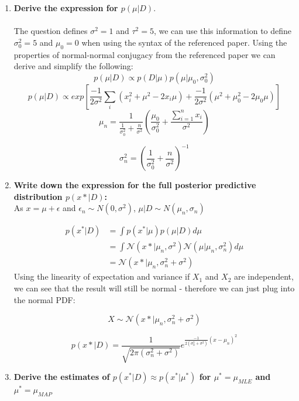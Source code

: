 \documentclass[submit]{harvardml}
\begin{document}
\begin{enumerate}
    \item \textbf{Derive the expression for $p(\mu | D)$}.\\ \\
    The question defines $\sigma^2 = 1$ and $\tau^2 = 5$, we can use this information to define $\sigma_0^2 = 5$ and $\mu_0 = 0$ when using the syntax of the referenced paper.
    Using the properties of normal-normal conjugacy from the referenced paper we can derive and simplify the following:
    $$
        p(\mu | D) \propto p(D | \mu)p(\mu | \mu_0,\sigma_0^2)
    $$
    $$
        p(\mu|D) \propto exp \left[ \frac{-1}{2\sigma^2} \sum_i (x_i^2 + \mu^2 - 2 x_i \mu) + \frac{-1}{2\sigma^2} (\mu^2 + \mu_0^2 - 2\mu_0 \mu) \right]
    $$
    $$
        \mu_n = \frac{1}{\frac{1}{\sigma_0^2} + \frac{n}{\sigma^2}} \left( \frac{\mu_0}{\sigma_0^2} + \frac{\sum^n_{i=1} x_i}{\sigma^2} \right)
    $$
    
    $$
        \sigma_n^2 = \left( \frac{1}{\sigma_0^2} + \frac{n}{\sigma^2} \right)^{-1}
    $$
    \item \textbf{Write down the expression for the full posterior predictive distribution $p(x* | D)$:}\\
    
    As $x = \mu + \epsilon$ and $\epsilon_n \sim N(0,\sigma^2)$, $\mu |D \sim N(\mu_n, \sigma_n)$ 
    
    \begin{align*}
        p(x^*|D) &= \int p(x^*|\mu)p(\mu|D) d\mu \\
        &= \int \mathcal{N} (x*|\mu_n , \sigma^2) \mathcal{N} (\mu | \mu_n, \sigma_n^2) d\mu \\
        &= \mathcal{N} (x*|\mu_n , \sigma^2_n + \sigma^2)
    \end{align*}
    Using the linearity of expectation and variance if $X_1$ and $X_2$ are independent, we can see that the result will still be normal - therefore we can just plug into the normal PDF:
    
    $$
        X \sim \mathcal{N} (x*|\mu_n , \sigma^2_n + \sigma^2)
    $$
    
    $$
        p(x* |D) = \frac{1}{\sqrt{2 \pi (\sigma^2_n + \sigma^2)}} e^{ \frac{-1}{2 (\sigma^2_n + \sigma^2)}(x - \mu_n)^2 } 
    $$
    
    \item \textbf{Derive the estimates of $p(x^*|D) \approx p(x^*|\mu^*)$ for $\mu^* = \mu_{MLE}$ and $\mu^* = \mu_{MAP}$}
    

\end{enumerate}
\end{document}
